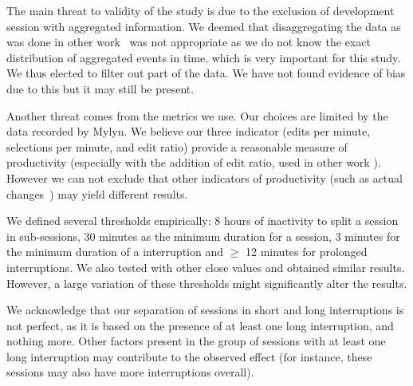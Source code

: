 \documentclass[times]{smrauth}
\begin{document}
The main threat to validity of the study is due to the exclusion of development session with aggregated information. We deemed that disaggregating the data as was done in other work~\cite{YR11}  was not appropriate as we do not know the exact distribution of aggregated events in time, which is very important for this study. We thus elected to filter out part of the data. We have not found evidence of bias due to this but it may still be present.

Another threat comes from the metrics we use. Our choices are limited by the data recorded by Mylyn. We believe our three indicator (edits per minute, selections per minute, and edit ratio) provide a reasonable measure of productivity (especially with the addition of edit ratio, used in other work \cite{KM06}). However we can not exclude that other indicators of productivity (such as actual changes~\cite{RL10}) may yield different results.

We defined several thresholds empirically: 8 hours of inactivity to split a session in sub-sessions, 30 minutes as the minimum duration for a session, 3 minutes for the minimum duration of a interruption and  $\geq$ 12 minutes for prolonged interruptions. We also tested with other close values and obtained similar results. However, a large variation of these thresholds might significantly alter the results. 

We acknowledge that our separation of sessions in short and long interruptions is not perfect, as it is based on the presence of at least one long interruption, and nothing more. Other factors present in the group of sessions with at least one long interruption may contribute to the observed effect (for instance, these sessions may also have more interruptions overall).


\end{document}
